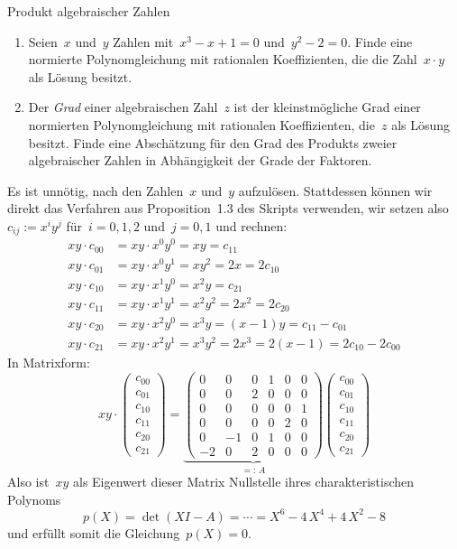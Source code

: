\documentclass{algblatt}
\begin{document}
\begin{aufgabe}{Produkt algebraischer Zahlen}
\begin{enumerate}
\item Seien~$x$ und~$y$ Zahlen mit~$x^3-x+1=0$ und~$y^2-2=0$.
Finde eine normierte Polynomgleichung mit rationalen
Koeffizienten, die die Zahl~$x \cdot y$ als Lösung besitzt.
\item Der \emph{Grad} einer algebraischen Zahl~$z$ ist der kleinstmögliche Grad
einer normierten Polynomgleichung mit rationalen Koeffizienten, die~$z$ als Lösung
besitzt. Finde eine Abschätzung für den Grad des Produkts zweier algebraischer
Zahlen in Abhängigkeit der Grade der Faktoren.
\end{enumerate}
\begin{loesungE}
\item Es ist unnötig, nach den Zahlen~$x$ und~$y$ aufzulösen. Stattdessen
können wir direkt das Verfahren aus Proposition~1.3 des Skripts verwenden, wir
setzen also $c_{ij} := x^i y^j$ für~$i = 0,1,2$ und~$j = 0,1$ und rechnen:
\begin{align*}
  xy \cdot c_{00} &= xy \cdot x^0 y^0 = xy = c_{11} \\
  xy \cdot c_{01} &= xy \cdot x^0 y^1 = xy^2 = 2x = 2 c_{10} \\
  xy \cdot c_{10} &= xy \cdot x^1 y^0 = x^2y = c_{21} \\
  xy \cdot c_{11} &= xy \cdot x^1 y^1 = x^2y^2 = 2x^2 = 2 c_{20} \\
  xy \cdot c_{20} &= xy \cdot x^2 y^0 = x^3y = (x-1)y = c_{11} - c_{01} \\
  xy \cdot c_{21} &= xy \cdot x^2 y^1 = x^3y^2 = 2x^3 = 2(x-1) = 2 c_{10} - 2 c_{00}
\end{align*}
In Matrixform:
\[
  xy \cdot
  \begin{pmatrix}c_{00}\\c_{01}\\c_{10}\\c_{11}\\c_{20}\\c_{21}\end{pmatrix} =
  \underbrace{\begin{pmatrix}
    0&0&0&1&0&0 \\
    0&0&2&0&0&0 \\
    0&0&0&0&0&1 \\
    0&0&0&0&2&0 \\
    0&-1&0&1&0&0 \\
    -2&0&2&0&0&0
  \end{pmatrix}}_{=:\,A}
  \begin{pmatrix}c_{00}\\c_{01}\\c_{10}\\c_{11}\\c_{20}\\c_{21}\end{pmatrix}
\]
Also ist~$xy$ als Eigenwert dieser Matrix Nullstelle ihres charakteristischen
Polynoms
\[ p(X) = \det(X I - A) = \cdots = X^6 - 4\,X^4 + 4\,X^2 - 8 \]
und erfüllt somit die Gleichung~$p(X) = 0$.


\end{loesungE}
\end{aufgabe}
\end{document}
